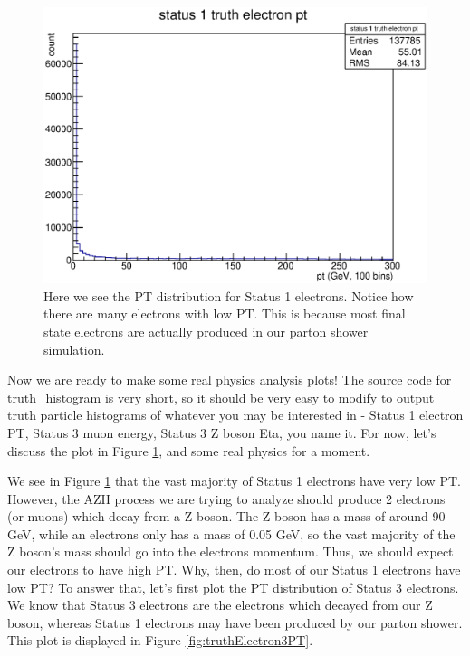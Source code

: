 \documentclass{article}
\begin{document}
\begin{figure}[h]
	\centering
	\includegraphics[width = \linewidth]{truth_electron_1_pt.eps}
	\caption{Here we see the PT distribution for Status 1 electrons. Notice how there are many electrons with low PT. This is because most final state electrons are actually produced in our parton shower simulation.}
	\label{fig:truthElectron1PT}
\end{figure}

\bigskip

Now we are ready to make some real physics analysis plots! The source code for truth\_histogram is very short, so it should be very easy to modify to output truth particle histograms of whatever you may be interested in - Status 1 electron PT, Status 3 muon energy, Status 3 Z boson Eta, you name it. For now, let's discuss the plot in Figure \ref{fig:truthElectron1PT}, and some real physics for a moment.

\bigskip

We see in Figure \ref{fig:truthElectron1PT} that the vast majority of Status 1 electrons have very low PT. However, the AZH process we are trying to analyze should produce 2 electrons (or muons) which decay from a Z boson. The Z boson has a mass of around 90 GeV, while an electrons only has a mass of 0.05 GeV, so the vast majority of the Z boson's mass should go into the electrons momentum. Thus, we should expect our electrons to have high PT. Why, then, do most of our Status 1 electrons have low PT? To answer that, let's first plot the PT distribution of Status 3 electrons. We know that Status 3 electrons are the electrons which decayed from our Z boson, whereas Status 1 electrons may have been produced by our parton shower. This plot is displayed in Figure \ref{fig:truthElectron3PT}.
\end{document}
